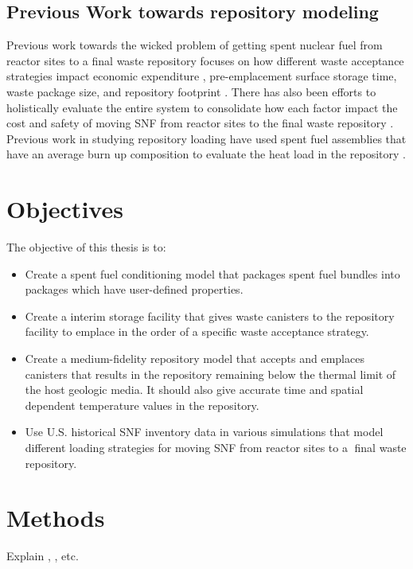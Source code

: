 \subsection{Previous Work towards repository modeling}
Previous work towards the wicked problem of getting spent nuclear fuel from reactor 
sites to a final waste repository focuses on how different waste acceptance strategies 
impact economic expenditure \cite{nesbit_proposed_2015}, pre-emplacement 
surface storage time, waste package size, and repository 
footprint \cite{greenberg_application_2012}. 
There has also been efforts to holistically evaluate the entire system to consolidate 
how each factor impact the cost and safety of moving SNF from 
reactor sites to the final waste repository \cite{nutt_waste_2015}.
Previous work in studying repository loading have used spent fuel assemblies 
that have an average burn up composition \cite{johnson_optimizing_2016} 
to evaluate the heat load in the repository \cite{greenberg_application_2012}. 

\section{Objectives}
The objective of this thesis is to: 
\begin{itemize}
    \item Create a \Cyclus spent fuel conditioning model that
    packages spent fuel bundles into packages which have
    user-defined properties.
    \item Create a \Cyclus interim storage facility that gives 
    waste canisters to the repository facility to emplace in the 
    order of a specific waste acceptance strategy. 
    \item Create a \Cyclus medium-fidelity repository model that
    accepts and emplaces canisters that results in the repository 
    remaining below the thermal limit of the host geologic media.
    It should also give accurate time and spatial dependent 
    temperature values in the repository. 
    \item Use U.S. historical SNF inventory data 
    \cite{peterson_unf-st&dards_2017} in various simulations
    that model different loading strategies for moving 
    \gls{SNF} from reactor sites to a final waste repository.
\end{itemize}


\section{Methods}
Explain \Cyclus, \Cycamore, \Cyder etc.  
